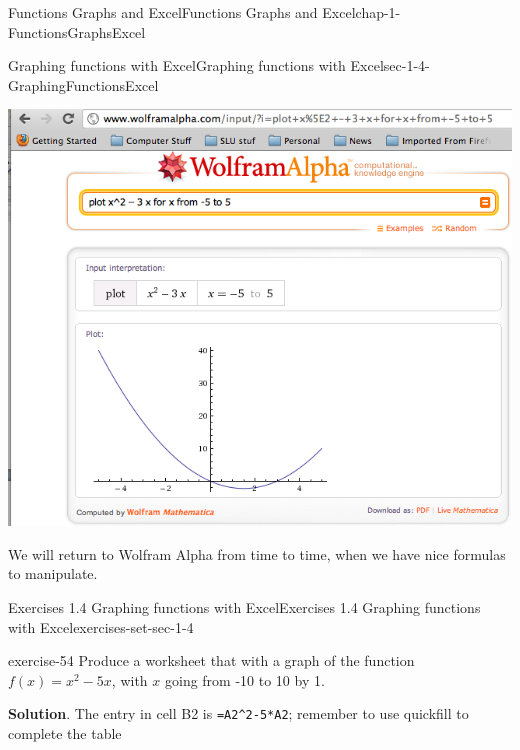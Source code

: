\documentclass[oneside,10pt,]{book}
\newcommand{\mono}[1]{\texttt{#1}}
\numberwithin{equation}{section}
\begin{document}
\begin{chapterptx}{Functions Graphs and Excel}{}{Functions Graphs and Excel}{}{}{chap-1-FunctionsGraphsExcel}
\begin{sectionptx}{Graphing functions with Excel}{}{Graphing functions with Excel}{}{}{sec-1-4-GraphingFunctionsExcel}
\begin{sidebyside}{1}{0.1}{0.1}{0}
\begin{sbspanel}{0.8}
\includegraphics[width=1\linewidth]{images/sec1-4-14.png}
\end{sbspanel}%
\end{sidebyside}%
\par
\hypertarget{p-340}{}%
We will return to Wolfram Alpha from time to time, when we have nice formulas to manipulate.%
%
%
\typeout{************************************************}
\typeout{************************************************}
%
\begin{exercises-subsection-numberless}{Exercises 1.4 Graphing functions with Excel}{}{Exercises 1.4 Graphing functions with Excel}{}{}{exercises-set-sec-1-4}
\begin{divisionexercise}{1}{}{}{exercise-54}%
\hypertarget{p-341}{}%
Produce a worksheet that with a graph of the function \(f(x) = x^2 - 5 x\), with \(x\) going from -10 to 10 by 1.%
\par\smallskip%
\noindent\textbf{Solution}.\hypertarget{solution-27}{}\quad%
\hypertarget{p-342}{}%
The entry in cell B2 is \mono{=A2\textasciicircum{}2-5*A2}; remember to use quickfill to complete the table%
\begin{sidebyside}{1}{0.1}{0.1}{0}%
\begin{sbspanel}{0.8}%

\end{sbspanel}
\end{sidebyside}
\end{divisionexercise}
\end{exercises-subsection-numberless}
\end{sectionptx}
\end{chapterptx}
\end{document}
